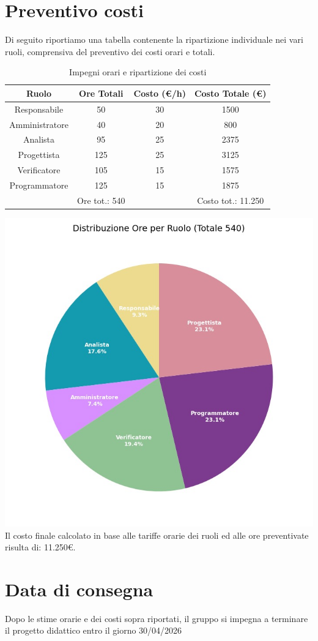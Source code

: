 \documentclass{article}
\begin{document}
	
	\section{Preventivo costi}
	Di seguito riportiamo una tabella contenente la ripartizione individuale nei vari ruoli, comprensiva del preventivo dei costi orari e totali.
	\begin{table}[h!]
	\centering
	\begin{tabular}{|c|c|c|c|}
	\hline
	\rowcolor{gray!25}
	Ruolo & Ore Totali & Costo (€/h) & Costo Totale (€) \\ \hline
	Responsabile & 50 & 30 & 1500 \\ \hline
	Amministratore & 40 & 20 & 800 \\ \hline
	Analista & 95 & 25 & 2375\\ \hline
	Progettista & 125 & 25 & 3125 \\ \hline
	Verificatore &  105 & 15 & 1575 \\ \hline
	Programmatore &  125 & 15 & 1875 \\ \hline
	\rowcolor{gray!25}
	& Ore tot.: 540  &  & Costo tot.: 11.250 \\ \hline
	\end{tabular}
	\caption{Impegni orari e ripartizione dei costi}
	\end{table}
	\FloatBarrier
	\includegraphics[width=1.0\textwidth]{grafico_costi.jpeg}
	Il costo finale calcolato in base alle tariffe orarie dei ruoli ed alle ore preventivate risulta di: 11.250€.
	
	\section{Data di consegna}
	Dopo le stime orarie e dei costi sopra riportati, il gruppo si impegna a terminare il progetto didattico entro il giorno 30/04/2026
	
	
	
\end{document}
